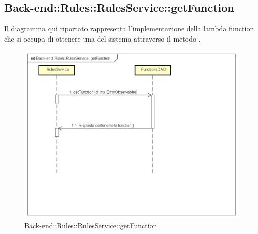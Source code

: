 \subsection{Back-end::Rules::RulesService::getFunction}
Il diagramma qui riportato rappresenta l'implementazione della lambda function che si occupa di ottenere una  del sistema attraverso il metodo . 
 \begin{figure}[h] \centering \includegraphics[width=\textwidth,height=\textheight,keepaspectratio]{images/diagrams/back-end/Ufficial_Backend/Back-endRulesRulesServicegetFunction.png} 	\caption{Back-end::Rules::RulesService::getFunction}
\end{figure}
\newpage


